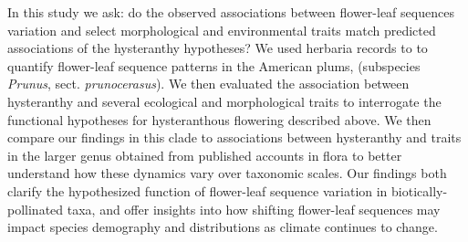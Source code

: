 \documentclass{article}[11pt]
\begin{document}
\noindent In this study we ask: do the observed associations between flower-leaf sequences variation and select morphological and environmental traits match predicted associations of the hysteranthy hypotheses? We used herbaria records to to quantify flower-leaf sequence patterns in the American plums, (subspecies  \textit{Prunus}, sect. \textit{prunocerasus}). We then evaluated the association between hysteranthy and several ecological and morphological traits to interrogate the functional hypotheses for hysteranthous flowering described above. We then compare our findings in this clade to associations between hysteranthy and traits in the larger genus obtained from published accounts in flora to better understand how these dynamics vary over taxonomic scales. Our findings both clarify the hypothesized function of flower-leaf sequence variation in biotically-pollinated taxa, and offer insights into how shifting flower-leaf sequences may impact species demography and distributions as climate continues to change.


\end{document}
